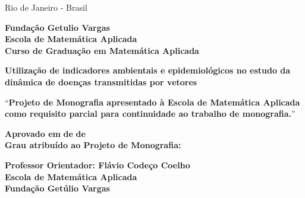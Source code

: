 \documentclass[12pt]{article}
\begin{document}
\par
\vfill
\begin{center}
{{\normalsize Rio de Janeiro - Brasil}\\
{\normalsize \the\year}}
\end{center}

\thispagestyle{empty}

\newpage
\begin{center}
\textbf{\LARGE Fundação Getulio Vargas}\\ 
\textbf{\LARGE Escola de Matemática Aplicada}\\
\textbf{\LARGE Curso de Graduação em Matemática Aplicada}

\par
\vspace{90pt}
\textbf{\Large Utilização de indicadores ambientais e epidemiológicos no estudo da dinâmica de doenças transmitidas por vetores}


\par
\vspace{65pt}

``\textbf{Projeto de Monografia apresentado à Escola de Matemática Aplicada como requisito parcial para continuidade ao trabalho de monografia.}''
\end{center}

\par
\vspace{65pt}
\begin{center}

\textbf{Aprovado em } \makebox[30pt]{\hrulefill}\textbf{ de }\makebox[120pt]{\hrulefill}\textbf{ de }\makebox[50pt]{\hrulefill}
\\
\vspace{5pt}
\textbf{Grau atribuído ao Projeto de Monografia:} \makebox[30pt]{\hrulefill}\\
\end{center}


\par
\vspace{40pt}
\begin{center}

\hrulefill

\vspace{5pt}
\textbf{Professor Orientador: Flávio Codeço Coelho}\\
\textbf{Escola de Matemática Aplicada}\\
\textbf{Fundação Getúlio Vargas}
\end{center}

\thispagestyle{empty}
\end{document}
